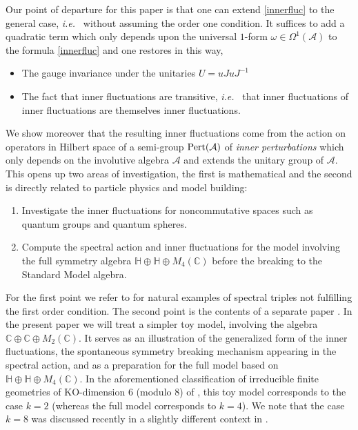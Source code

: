 \documentclass[preprint]{revtex4}
\begin{document}
Our point of departure for this paper is that one can extend \eqref{innerfluc} to the general case, {{\it i.e.\/}\ } without assuming the order one condition. It suffices to add a quadratic term which only depends upon the universal $1$-form $\omega\in \Omega^1({\mathcal{A}})$ to the formula \eqref{innerfluc} and one restores in this way,
\begin{itemize}
  \item The gauge invariance under the unitaries $U=uJuJ^{-1}$
  \item The fact that inner fluctuations are transitive, {{\it i.e.\/}\ } that inner fluctuations
  of inner fluctuations are themselves inner fluctuations.
\end{itemize}
We show moreover that the resulting inner fluctuations come from the action on operators in Hilbert space of a semi-group ${{\rm Pert}}({\mathcal{A}})$ of {\em inner perturbations} which only depends on the involutive algebra ${\mathcal{A}}$ and extends the unitary group of ${\mathcal{A}}$.
This opens up two areas of investigation, the first is mathematical and the second is directly related to particle physics and model building:
\begin{enumerate}
  \item Investigate the inner fluctuations for noncommutative spaces such as quantum groups
  and quantum spheres.
  \item Compute the spectral action and inner fluctuations for the model involving the full symmetry algebra $\mathbb H\oplus \mathbb H\oplus M_4({\mathbb{C}})$ before the breaking to the Standard Model algebra.
\end{enumerate}
For the first point we refer to \cite{diracs2q,diracsu2,indexsu2,diracalls2q} for natural examples of spectral triples not fulfilling the first order condition. The second point is the contents of a separate paper \cite{ncgps}. In the present paper we will treat a simpler toy model, involving the algebra ${\mathbb{C}} \oplus {\mathbb{C}} \oplus M_2({\mathbb{C}})$. It serves as an illustration of the generalized form of the inner fluctuations, the spontaneous symmetry breaking mechanism appearing in the spectral action, and as a preparation for the full model based on ${\mathbb{H}} \oplus {\mathbb{H}} \oplus M_4({\mathbb{C}})$. In the aforementioned classification of irreducible finite geometries of KO-dimension 6 (modulo 8) of \cite{CC07b}, this toy model corresponds to the case $k=2$ (whereas the full model corresponds to $k=4$). We note that the case $k=8$ was discussed recently in a slightly different context in \cite{DLM13}.
\end{document}
